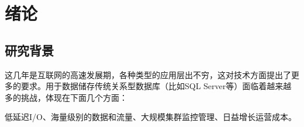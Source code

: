 \documentclass{zjutthesis}
\begin{document}



\frontmatter



\tableofcontents           %
\listoffigures             %
\listoftables              %


\mainmatter



\chapter{绪论}
\section{研究背景}
这几年是互联网的高速发展期，各种类型的应用层出不穷，这对技术方面提出了更多的要求。用于数据储存传统关系型数据库（比如SQL Server等）面临着越来越多的挑战，体现在下面几个方面：

低延迟I/O、海量级别的数据和流量、大规模集群监控管理、日益增长运营成本。
\end{document}

